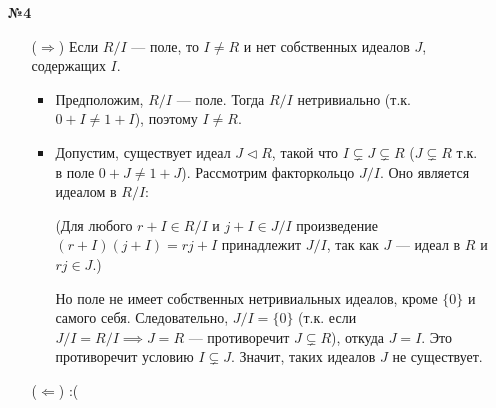 \documentclass[a4paper]{article}
\begin{document}
\begin{enumerate}
    \item[\textbf{№4}]\begin{enumerate}
        \item[(\(\Rightarrow\))] Если \( R/I \) --- поле, то \( I \neq R \) 
        и нет собственных идеалов \( J \), содержащих \( I \).
        \begin{itemize}
            \item Предположим, \( R/I \) --- поле. 
            Тогда \( R/I \) нетривиально (т.к. $0+I \neq 1 + I$), поэтому \( I \neq R \).
            \item Допустим, существует идеал \( J \triangleleft R \),
            такой что \( I \subsetneq J \subsetneq R \) ($J \subsetneq R$ т.к. в поле $0+J \neq 1 + J$). 
            Рассмотрим факторкольцо \( J/I \). Оно является идеалом в \( R/I \):

            (Для любого \( r + I \in R/I \) и \( j + I \in J/I \) произведение
             \( (r + I)(j + I) = rj + I \) принадлежит \( J/I \), так как \( J \) 
            --- идеал в \( R \) и \( rj \in J \).)
            
            Но поле не имеет собственных нетривиальных идеалов, кроме \(\{0\}\) и самого себя. 
            Следовательно, \( J/I = \{0\} \) (т.к. если \( J/I = R/I \implies J = R \) --- противоречит \( J \subsetneq R \)), откуда \( J = I \). 
            Это противоречит условию \( I \subsetneq J \).
            Значит, таких идеалов \( J \) не существует.
        \end{itemize}

        \item[(\(\Leftarrow\))] :( 
    \end{enumerate}
\end{enumerate}
\end{document}
